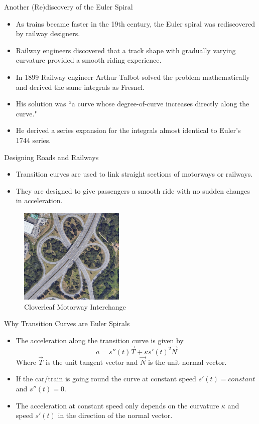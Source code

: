 \documentclass{beamer}
\begin{document}
\begin{frame}{Another (Re)discovery of the Euler Spiral}
	\begin{itemize}
		\item As trains became faster in the 19th century, the Euler spiral was rediscovered by railway designers.
		\item Railway engineers discovered that a track shape with gradually varying curvature provided a smooth riding experience.
		\item In 1899 Railway engineer Arthur Talbot solved the problem mathematically and derived the same integrals as Fresnel.
		\item His solution was ``a curve whose degree-of-curve increases directly along the curve."
		\item He derived a series expansion for the integrals almost identical to Euler's 1744 series. 
	\end{itemize}
\end{frame}

\begin{frame}{Designing Roads and Railways}
	\begin{itemize}
		\item Transition curves are used to link straight sections of motorways or railways.
		\item They are designed to give passengers a smooth ride with no sudden changes in acceleration.

	\end{itemize}
		\begin{figure}
		\caption{Cloverleaf Motorway Interchange}
		\centering
		\includegraphics[width=50mm, scale=0.5]{cloverleaf_motorway.png}
	\end{figure}

\end{frame}

\begin{frame}{Why Transition Curves are Euler Spirals}
	\begin{itemize}
	\item The acceleration along the transition curve is given by
 	 \[
 	 a=s''(t) \vec{T}+\kappa s'(t)^2 \vec{N}
 	 \]
 	 Where $\vec{T}$ is the unit tangent vector and $\vec{N}$ is the unit normal vector.
 	 \item If the car/train is going round the curve at constant speed $s'(t)=constant$ and $s''(t)=0$.	
 	 \item The acceleration at constant speed only depends on the curvature $\kappa$ and speed $s'(t)$ in the direction of the normal vector.
	\end{itemize}
\end{frame}
\end{document}
